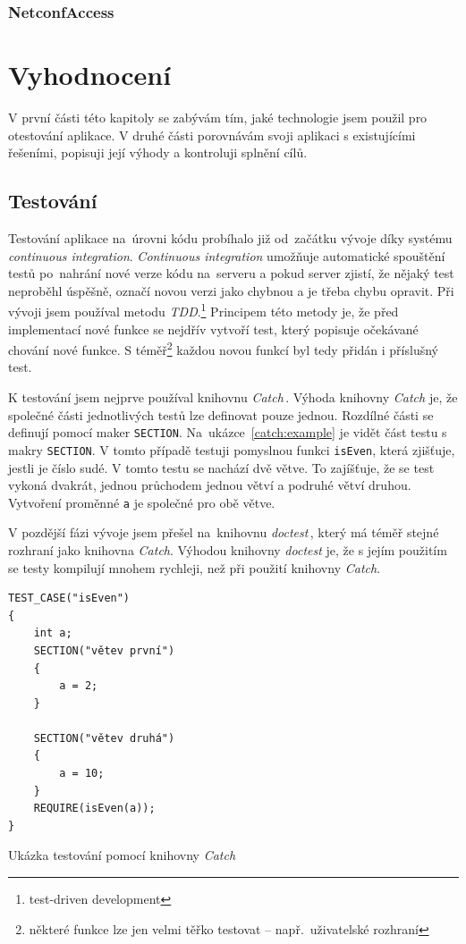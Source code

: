 \documentclass[thesis=B,czech,hidelinks]{FITthesis}[2019/03/06]
\begin{document}
\subsection{NetconfAccess}


\chapter{Vyhodnocení}
V první části této kapitoly se zabývám tím, jaké technologie jsem použil pro otestování aplikace. V druhé části porovnávám svoji aplikaci s existujícími řešeními, popisuji její výhody a kontroluji splnění cílů.
\section{Testování}
Testování aplikace na~úrovni kódu probíhalo již od~začátku vývoje díky systému \textit{continuous integration}. \textit{Continuous integration} umožňuje automatické spouštění testů po~nahrání nové verze kódu na~serveru a pokud server zjistí, že nějaký test neproběhl úspěšně, označí novou verzi jako chybnou a je třeba chybu opravit. Při vývoji jsem používal metodu \textit{TDD}.\footnote{test-driven development} Principem této metody je, že před implementací nové funkce se nejdřív vytvoří test, který popisuje očekávané chování nové funkce. S téměř\footnote{některé funkce lze jen velmi těřko testovat -- např.\ uživatelské rozhraní} každou novou funkcí byl tedy přidán i příslušný test.

K testování jsem nejprve používal knihovnu \textit{Catch}\,\cite{catch}. Výhoda knihovny \textit{Catch} je, že společné části jednotlivých testů lze definovat pouze jednou. Rozdílné části se definují pomocí maker \texttt{SECTION}. Na~ukázce~\ref{catch:example} je vidět část testu s makry \texttt{SECTION}. V tomto případě testuji pomyslnou funkci \texttt{isEven}, která zjišťuje, jestli je číslo sudé. V tomto testu se nachází dvě větve. To zajíšťuje, že se test vykoná dvakrát, jednou průchodem jednou větví a podruhé větví druhou. Vytvoření proměnné \texttt{a} je společné pro obě větve.

V pozdější fázi vývoje jsem přešel na~knihovnu \textit{doctest}\,\cite{doctest}, který má téměř stejné rozhraní jako knihovna \textit{Catch}. Výhodou knihovny \textit{doctest} je, že s jejím použitím se testy kompilují mnohem rychleji, než při použití knihovny \textit{Catch}.

\begin{listing}
\begin{verbatim}
TEST_CASE("isEven")
{
    int a;
    SECTION("větev první")
    {
        a = 2;
    }

    SECTION("větev druhá")
    {
        a = 10;
    }
    REQUIRE(isEven(a));
}
\end{verbatim}
\caption{Ukázka testování pomocí knihovny \textit{Catch}}\label{catch:example}
\end{listing}
\end{document}
